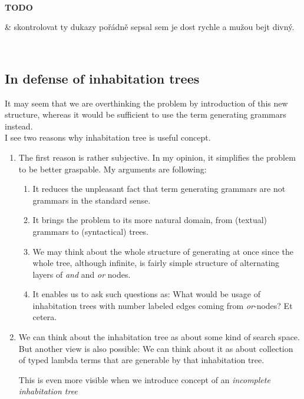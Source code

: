 \documentclass[12pt,a4paper]{report}
\newenvironment{todo}
{ ~\\[0.5em]
  {\color{red}\textbf{TODO}}
  \begin{easylist}[itemize]}
{ \end{easylist}
  ~}
\begin{document}
\begin{todo}
& skontrolovat ty dukazy pořádně sepsal sem 
  je dost rychle a mužou bejt divný. 
\end{todo}


\newpage
\subsection{In defense of inhabitation trees}

It may seem that we are overthinking the problem by introduction
of this new structure, whereas it would be sufficient to
use the term generating grammars instead.\\

I see two reasons why inhabitation tree is useful concept.

\begin{enumerate}
\item The first reason is rather subjective.
      In my opinion, it simplifies the problem to be
      better graspable. My arguments are following: 
      \begin{enumerate}
      \item
      It reduces the unpleasant fact
      that term generating grammars are not grammars in
      the standard sense. 
      \item
      It brings the problem to 
      its more natural domain, 
      from (textual) grammars 
      to (syntactical) trees.
      \item
      We may think about the whole structure of generating 
      at once since the whole tree, although infinite, is
      fairly simple structure of alternating layers of \textit{and} 
      and \textit{or} nodes. 
      \item
      It enables us to ask such questions
      as: What would be usage of inhabitation trees with 
      number labeled edges coming from \textit{or}-nodes? Et cetera.
      \end{enumerate}   
\item We can think about the inhabitation tree as about 
      some kind of search space. But another view is also 
      possible: We can think about it as about collection
      of typed lambda terms that are generable by that inhabitation
      tree. 
      
      This is even more visible when we introduce
      concept of an \textit{incomplete inhabitation tree}
        
\end{enumerate}
\end{document}
